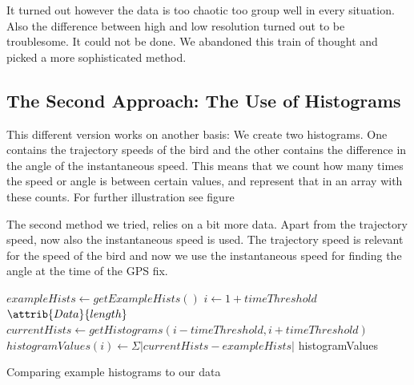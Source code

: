 It turned out however the data is too chaotic too group well in every situation. 
Also the difference between high and low resolution turned out to be troublesome. It
could not be done. We abandoned this train of thought and picked a more sophisticated 
method.




\subsection{The Second Approach: The Use of Histograms}
%
%
%

This different version works on another basis: We create two histograms. One
contains the trajectory speeds of the bird and the other contains the
difference in the angle of the instantaneous speed. This means that we count
how many times the speed or angle is between certain values, and represent that
in an array with these counts. For further illustration see figure

The second method we tried, relies on a bit more data. Apart from the trajectory
speed, now also the instantaneous speed is used. The trajectory speed is relevant for
the speed of the bird and now we use the instantaneous speed for finding the angle
at the time of the GPS fix. 


\begin{algorithm}
\begin{codebox}
\li $exampleHists \gets getExampleHists()$
\li \For $i \gets 1 + timeThreshold$ \To $\attrib{Data}{length}$ 
\li \Do
    $currentHists \gets getHistograms(i-timeThreshold, i+timeThreshold)$
    \li $histogramValues(i) \gets \Sigma \left| currentHists - exampleHists \right|$
\End
\li \Return histogramValues
\end{codebox}
\caption{Comparing example histograms to our data}
\label{alg:hist}
\end{algorithm}

